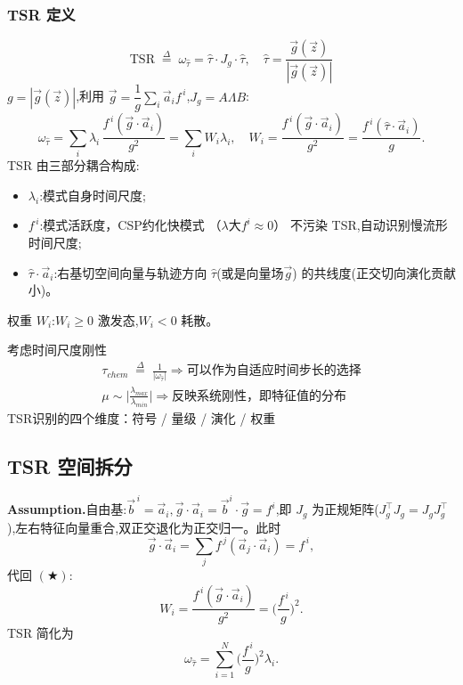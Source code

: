 \documentclass[11pt,a4paper]{article}
\newcommand{\Jg}{J_{\!g}}
\begin{document}
\subsubsection*{TSR 定义}
\begin{equation}
\boxed{\;
\text{TSR}\;\overset{\Delta}{=}\;\omega_{\hat\tau}=\hat\tau\cdot\Jg\cdot\hat\tau,\quad
\hat\tau=\frac{\vec g(\vec z)}{|\vec g(\vec z)|}\;
}
\end{equation}
$g=|\vec g(\vec z)|$,利用 $\vec g=\dfrac{1}{g}\sum_i\vec a_i f^{\,i}$,$\Jg=A\Lambda B$:
\begin{equation}
\omega_{\hat\tau}=\sum_i\lambda_i\,\frac{f^{\,i}(\vec g\cdot\vec a_i)}{g^{2}}
=\sum_i W_i\lambda_i,\quad
W_i=\frac{f^{\,i}(\vec g\cdot\vec a_i)}{g^{2}}=\frac{f^{\,i}(\hat\tau\cdot\vec a_i)}{g}.\tag{$\bigstar$}
\end{equation}
TSR 由三部分耦合构成:
\begin{itemize}[leftmargin=2em]
    \item $\lambda_i$:模式自身时间尺度;
    \item $f^{\,i}$:模式活跃度，CSP约化快模式 （$\lambda 大 f^i\approx 0$） 不污染 TSR,自动识别慢流形时间尺度;
    \item $\hat\tau\cdot\vec a_i$:右基切空间向量与轨迹方向 $\hat\tau$(或是向量场$\vec g$) 的共线度(正交切向演化贡献小)。
\end{itemize}
权重 $W_i$:$W_i\geq 0$ 激发态,$W_i<0$ 耗散。

考虑时间尺度刚性
\begin{align}
\tau_{chem}\;\overset{\Delta}{=}\;\frac{1}{|\omega_{\hat{\tau}}|}\Rightarrow\text{可以作为自适应时间步长的选择} \nonumber\\
\mu\sim\Big|\frac{\lambda_{max}}{\lambda_{min}}\Big|\Rightarrow\text{反映系统刚性，即特征值的分布} \nonumber
\end{align}
TSR识别的四个维度：符号 / 量级 / 演化 / 权重

\subsection{TSR 空间拆分}

\noindent\textbf{Assumption.}\quad 自由基:$\vec b^{\,i}=\vec a_i,\vec g\cdot \vec a_i=\vec b^i \cdot \vec g=f^i$,即 $\Jg$ 为正规矩阵($\Jg^\top\Jg=\Jg\Jg^\top$),左右特征向量重合,双正交退化为正交归一。此时
\begin{equation}
\vec g\cdot\vec a_i=\sum_{j}f^{\,j}(\vec a_j\cdot\vec a_i)=f^{\,i},
\end{equation}
代回 $(\bigstar)$:
\begin{equation}
W_i=\frac{f^{\,i}(\vec g\cdot\vec a_i)}{g^{2}}=\Big(\frac{f^{\,i}}{g}\Big)^{2}.
\end{equation}
TSR 简化为
\begin{equation}
\omega_{\hat\tau}=\sum_{i=1}^{N}\Big(\frac{f^{\,i}}{g}\Big)^{2}\lambda_i.
\end{equation}
\end{document}
